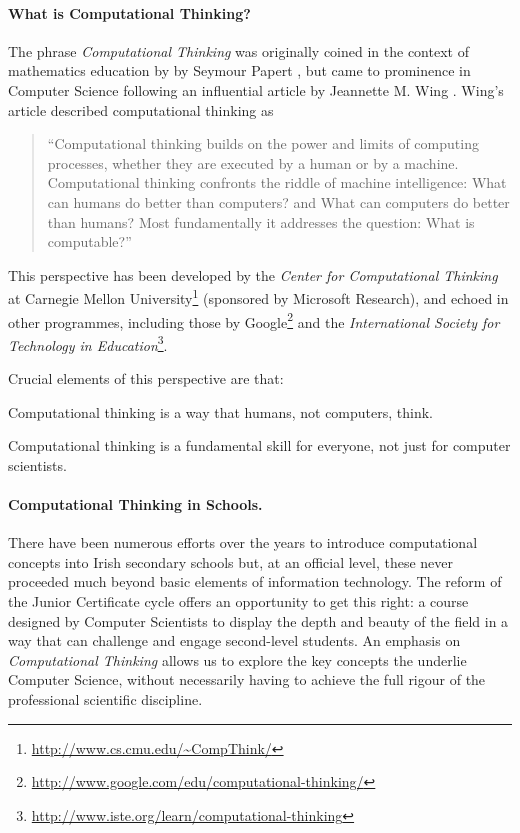 \documentclass[a4paper]{article}
\begin{document}
\paragraph{What is Computational Thinking?}

The phrase \textit{Computational Thinking} was originally coined in the context of mathematics education by by Seymour Papert \cite{papert96}, but came to prominence in Computer Science following an influential article by Jeannette M. Wing \cite{wing-cacm06}.  Wing's article described computational thinking as
\begin{quotation}
``Computational thinking
builds on the power and
limits of computing
processes, whether they are executed by a human or by a
machine.  Computational thinking confronts the riddle of machine intelligence: What can humans do better than computers? and What can computers do better than humans? Most fundamentally it addresses the question: What is
computable?''
\end{quotation}


This perspective has been developed by the 
\textit{Center for Computational Thinking} at Carnegie Mellon University\footnote{\url{http://www.cs.cmu.edu/~CompThink/}}
(sponsored by Microsoft Research), and echoed in other programmes, including those by 
Google\footnote{\url{http://www.google.com/edu/computational-thinking/}} and the
\textit{International Society for Technology in Education}\footnote{\url{http://www.iste.org/learn/computational-thinking}}.

Crucial elements of this perspective are that:
\begin{compactitem}
\item Computational thinking is a way that humans, not computers, think.
\item Computational thinking is a fundamental skill for
everyone, not just for computer scientists.
\end{compactitem}


\paragraph{Computational Thinking in Schools.}

There have been numerous efforts over the years to introduce computational concepts into Irish secondary schools but, at an official level, these never proceeded much beyond basic elements of information technology.  The reform of the Junior Certificate cycle offers an opportunity to get this right: a course designed by Computer Scientists to display the depth and beauty of the field in a way that can challenge and engage second-level students.  An emphasis on 
\textit{Computational Thinking} allows us to explore the key concepts the underlie Computer Science, without necessarily having to achieve the full rigour of the professional scientific discipline.
\end{document}
